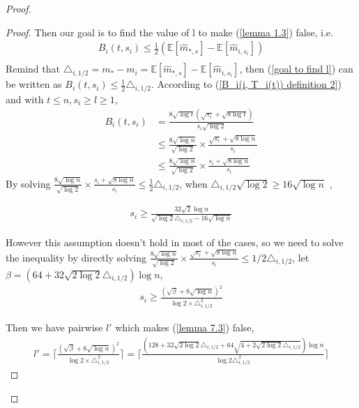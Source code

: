 \documentclass{article}
\theoremstyle{plain}
\begin{document}
\begin{proof}
\begin{proof}
    Then our goal is to find the value of l to make (\ref{lemma 1.3}) false, i.e. 
    \begin{align}
    \label{goal to find l}
        B_i(t, s_i) \leq  \frac{1}{2}(\mathbb{E}[\hat{m}_{*, s}] - \mathbb{E}[\hat{m}_{i, s_i}])\\
    \end{align}
    Remind that $\triangle_{i, 1/2} = m_* - m_i = \mathbb{E}[\hat{m}_{*, s}] - \mathbb{E}[\hat{m}_{i, s_i}]$, then (\ref{goal to find l}) can be written as $B_i(t, s_i) \leq  \frac{1}{2} \triangle_{i, 1/2}$. According to (\ref{B_i(i, T_i(t)) definition 2}) and with $t \leq n, s_i \geq l \geq 1$, 
    \begin{align}
        B_i(t, s_i) &= \frac{8 \sqrt{\log t} (\sqrt{ s_i} + \sqrt{8\log t})}{s_i  \sqrt{\log 2}}\\
        & \leq \frac{8 \sqrt{\log n}}{\sqrt{\log 2}} \times \frac{\sqrt{s_i} + \sqrt{8\log n}}{s_i}\\
        & \leq \frac{8 \sqrt{\log n}}{\sqrt{\log 2}} \times \frac{s_i + \sqrt{8\log n}}{s_i}
    \end{align}
    By solving $\frac{8 \sqrt{\log n}}{\sqrt{\log 2}} \times \frac{s_i + \sqrt{8\log n}}{s_i} \leq \frac{1}{2} \triangle_{i, 1/2}$, when $\triangle_{i, 1/2} \sqrt{\log 2} \geq 16 \sqrt{\log n}$ , 
    
    \begin{align}
        s_i \geq \frac{32 \sqrt{2} \log n}{\sqrt{\log 2} \triangle_{i, 1/2} - 16 \sqrt{\log n}} 
    \end{align}
    
    However this assumption doesn't hold in most of the cases, so we need to solve the inequality by directly solving $\frac{8 \sqrt{\log n}}{\sqrt{\log 2}} \times \frac{\sqrt{s_i} + \sqrt{8\log n}}{s_i} \leq 1/2 \triangle_{i, 1/2}$, let $\beta = (64 + 32 \sqrt{2 \log 2} \triangle_{i,1/2} )\log n$,
    \begin{align}
        s_i \geq \frac{(\sqrt{\beta} + 8 \sqrt{\log n})^2}{\log 2 \times \triangle_{i, 1/2}^2} 
    \end{align}
    
    Then we have pairwise $l'$ which makes (\ref{lemma 7.3}) false,
   \begin{align}
       l' = \lceil \frac{(\sqrt{\beta} + 8 \sqrt{\log n})^2}{\log 2 \times \triangle_{i, 1/2}^2} \rceil = \lceil \frac{(128 + 32 \sqrt{2 \log 2} \triangle_{i, 1/2} + 64 \sqrt{4 + 2 \sqrt{2 \log 2} \triangle_{i, 1/2}}) \log n}{\log 2 \triangle_{i, 1/2}^2} \rceil
   \end{align} 
   

\end{proof}
\end{proof}
\end{document}
